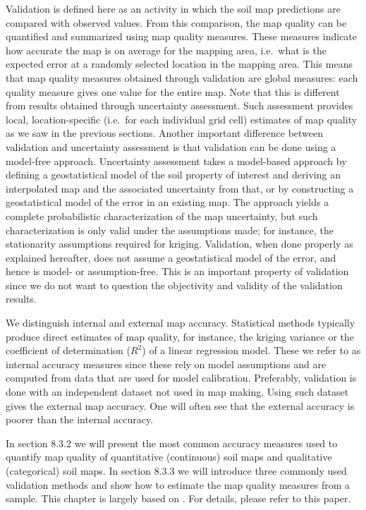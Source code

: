 \documentclass[10pt,b5paper,]{book}
\theoremstyle{definition}
\theoremstyle{definition}
\theoremstyle{definition}
\theoremstyle{remark}
\begin{document}
Validation is defined here as an activity in which the soil map
predictions are compared with observed values. From this comparison, the
map quality can be quantified and summarized using map quality measures.
These measures indicate how accurate the map is on average for the
mapping area, i.e.~what is the expected error at a randomly selected
location in the mapping area. This means that map quality measures
obtained through validation are global measures: each quality measure
gives one value for the entire map. Note that this is different from
results obtained through uncertainty assessment. Such assessment
provides local, location-specific (i.e.~for each individual grid cell)
estimates of map quality as we saw in the previous sections. Another
important difference between validation and uncertainty assessment is
that validation can be done using a model-free approach. Uncertainty
assessment takes a model-based approach by defining a geostatistical
model of the soil property of interest and deriving an interpolated map
and the associated uncertainty from that, or by constructing a
geostatistical model of the error in an existing map. The approach
yields a complete probabilistic characterization of the map uncertainty,
but such characterization is only valid under the assumptions made; for
instance, the stationarity assumptions required for kriging. Validation,
when done properly as explained hereafter, does not assume a
geostatistical model of the error, and hence is model- or
assumption-free. This is an important property of validation since we do
not want to question the objectivity and validity of the validation
results.

We distinguish internal and external map accuracy. Statistical methods
typically produce direct estimates of map quality, for instance, the
kriging variance or the coefficient of determination (\({R^2}\)) of a
linear regression model. These we refer to as internal accuracy measures
since these rely on model assumptions and are computed from data that
are used for model calibration. Preferably, validation is done with an
independent dataset not used in map making. Using such dataset gives the
external map accuracy. One will often see that the external accuracy is
poorer than the internal accuracy.

In section 8.3.2 we will present the most common accuracy measures used
to quantify map quality of quantitative (continuous) soil maps and
qualitative (categorical) soil maps. In section 8.3.3 we will introduce
three commonly used validation methods and show how to estimate the map
quality measures from a sample. This chapter is largely based on
\citet{brus2011sampling}. For details, please refer to this paper.
\end{document}
